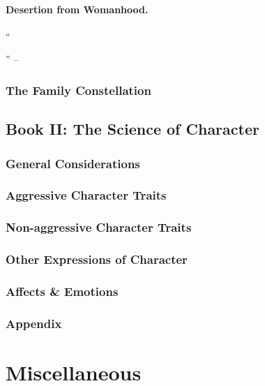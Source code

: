 \documentclass{article}
\begin{document}
\paragraph{Desertion from Womanhood.} ``

'' -- \cite[pp. 133--107]{Adler_human_nature}

\subsubsection{The Family Constellation}

\subsection{Book II: The Science of Character}

\subsubsection{General Considerations}

\subsubsection{Aggressive Character Traits}

\subsubsection{Non-aggressive Character Traits}

\subsubsection{Other Expressions of Character}

\subsubsection{Affects \& Emotions}

\subsubsection{Appendix}


\section{Miscellaneous}


\printbibliography[heading=bibintoc]
	
\end{document}
